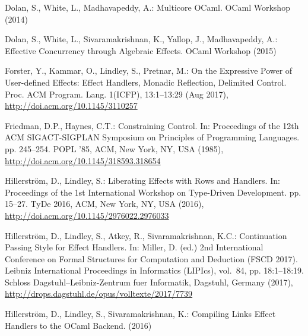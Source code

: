 \documentclass{llncs}
\begin{document}
\begin{thebibliography}{36}
Dolan, S., White, L., Madhavapeddy, A.: Multicore {OCaml}.
\newblock OCaml Workshop (2014)

Dolan, S., White, L., Sivaramakrishnan, K., Yallop, J., Madhavapeddy, A.:
  {Effective Concurrency through Algebraic Effects}.
\newblock OCaml Workshop (2015)

Forster, Y., Kammar, O., Lindley, S., Pretnar, M.: {On the Expressive Power of
  User-defined Effects: Effect Handlers, Monadic Reflection, Delimited
  Control}.
\newblock Proc. ACM Program. Lang. 1(ICFP), 13:1--13:29 (Aug 2017),
  \urlprefix\url{http://doi.acm.org/10.1145/3110257}

Friedman, D.P., Haynes, C.T.: {Constraining Control}.
\newblock In: Proceedings of the 12th ACM SIGACT-SIGPLAN Symposium on
  Principles of Programming Languages. pp. 245--254. POPL '85, ACM, New York,
  NY, USA (1985), \urlprefix\url{http://doi.acm.org/10.1145/318593.318654}

Hillerstr\"{o}m, D., Lindley, S.: {Liberating Effects with Rows and Handlers}.
\newblock In: Proceedings of the 1st International Workshop on Type-Driven
  Development. pp. 15--27. TyDe 2016, ACM, New York, NY, USA (2016),
  \urlprefix\url{http://doi.acm.org/10.1145/2976022.2976033}

Hillerstr{\"o}m, D., Lindley, S., Atkey, R., Sivaramakrishnan, K.C.:
  {Continuation Passing Style for Effect Handlers}.
\newblock In: Miller, D. (ed.) 2nd International Conference on Formal
  Structures for Computation and Deduction (FSCD 2017). Leibniz International
  Proceedings in Informatics (LIPIcs), vol.~84, pp. 18:1--18:19. Schloss
  Dagstuhl--Leibniz-Zentrum fuer Informatik, Dagstuhl, Germany (2017),
  \urlprefix\url{http://drops.dagstuhl.de/opus/volltexte/2017/7739}

Hillerström, D., Lindley, S., Sivaramakrishnan, K.: {Compiling {Links} Effect
  Handlers to the {OCaml} Backend}.
 (2016)


\end{thebibliography}
\end{document}

